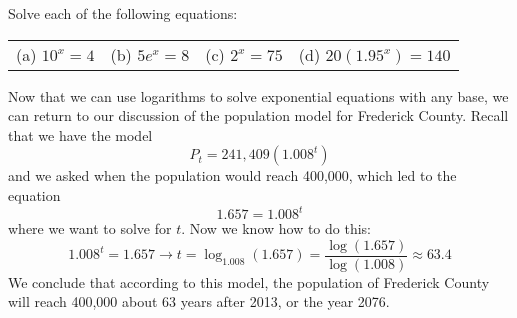 \begin{try}
Solve each of the following equations:
\begin{center}
\begin{tabular}{l l l l}
(a) $10^x=4$ & (b) $5e^x=8$ & (c) $2^x=75$ & (d) $20(1.95^x)=140$
\end{tabular}
\end{center}
\end{try}

Now that we can use logarithms to solve exponential equations with any base, we can return to our discussion of the population model for Frederick County.  Recall that we have the model
\[P_t = 241,409(1.008^t)\]
and we asked when the population would reach 400,000, which led to the equation \[1.657=1.008^t\] where we want to solve for $t$.  Now we know how to do this:
\[1.008^t=1.657 \longrightarrow t = \log_{1.008} (1.657) = \dfrac{\log(1.657)}{\log(1.008)} \approx 63.4\]
We conclude that according to this model, the population of Frederick County will reach 400,000 about 63 years after 2013, or the year 2076.

